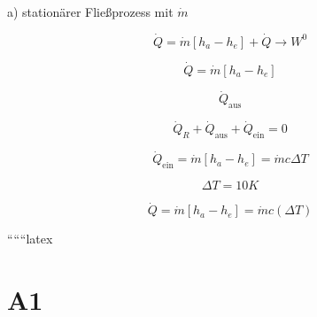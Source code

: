 a) stationärer Fließprozess mit $\dot{m}$

\[
\dot{Q} = \dot{m} [h_a - h_e] + \dot{Q} \rightarrow W^0
\]

\[
\dot{Q} = \dot{m} [h_a - h_e]
\]

\[
\dot{Q}_{\text{aus}}
\]

\[
\dot{Q}_R + \dot{Q}_{\text{aus}} + \dot{Q}_{\text{ein}} = 0
\]

\[
\dot{Q}_{\text{ein}} = \dot{m} [h_a - h_e] = \dot{m} c \Delta T
\]

\[
\Delta T = 10K
\]

\[
\dot{Q} = \dot{m} [h_a - h_e] = \dot{m} c (\Delta T)
\]

``````latex


\section*{A1}
